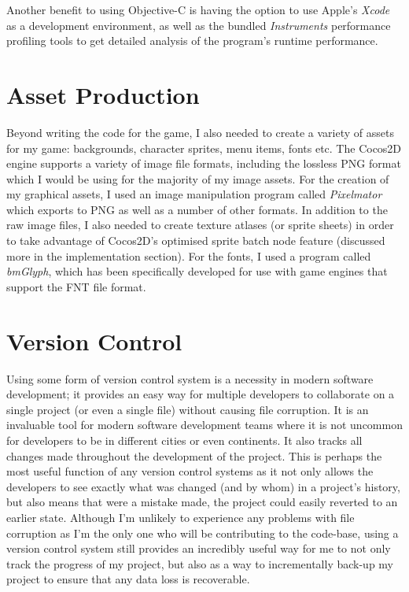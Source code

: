 \documentclass[a4paper,oneside]{report}
\begin{document}
Another benefit to using Objective-C is having the option to use Apple's \emph{Xcode} as a development environment, as well as the bundled \emph{Instruments} performance profiling tools to get detailed analysis of the program's runtime performance.

\section{Asset Production}

Beyond writing the code for the game, I also needed to create a variety of assets for my game: backgrounds, character sprites, menu items, fonts etc. The Cocos2D engine supports a variety of image file formats, including the lossless PNG format which I would be using for the majority of my image assets. For the creation of my graphical assets, I used an image manipulation program called \emph{Pixelmator} which exports to PNG as well as a number of other formats. In addition to the raw image files, I also needed to create texture atlases (or sprite sheets) in order to take advantage of Cocos2D's optimised sprite batch node feature (discussed more in the implementation section). For the fonts, I used a program called \emph{bmGlyph}, which has been specifically developed for use with game engines that support the FNT file format.

\section{Version Control}

Using some form of version control system is a necessity in modern software development; it provides an easy way for multiple developers to collaborate on a single project (or even a single file) without causing file corruption. It is an invaluable tool for modern software development teams where it is not uncommon for developers to be in different cities or even continents. It also tracks all changes made throughout the development of the project. This is perhaps the most useful function of any version control systems as it not only allows the developers to see exactly what was changed (and by whom) in a project's history, but also means that were a mistake made, the project could easily reverted to an earlier state. Although I'm unlikely to experience any problems with file corruption as I'm the only one who will be contributing to the code-base, using a version control system still provides an incredibly useful way for me to not only track the progress of my project, but also as a way to incrementally back-up my project to ensure that any data loss is recoverable.
\end{document}
